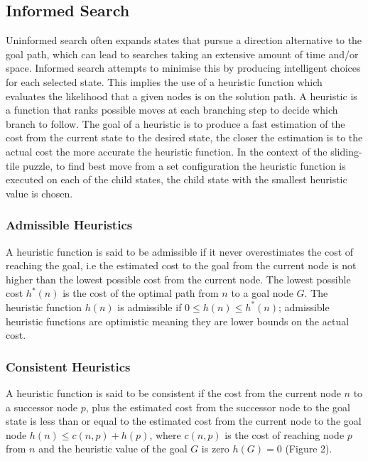 \documentclass[final]{cmpreport}
\begin{document}
\subsection{Informed Search}
Uninformed search often expands states that pursue a direction alternative to the goal path, which can lead to searches taking an extensive amount of time and/or space. Informed search attempts to minimise this by producing intelligent choices for each selected state. This implies the use of a heuristic function which evaluates the likelihood that a given nodes is on the solution path. A heuristic is a function that ranks possible moves at each branching step to decide which branch to follow. The goal of a heuristic is to produce a fast estimation of the cost from the current state to the desired state, the closer the estimation is to the actual cost the more accurate the heuristic function. In the context of the sliding-tile puzzle, to find best move from a set configuration the heuristic function is executed on each of the child states, the child state with the smallest heuristic value is chosen.
 


\subsubsection{Admissible Heuristics}
A heuristic function is said to be admissible if it never overestimates the cost of reaching the goal, i.e the estimated cost to the goal from the current node is not higher than the lowest possible cost from the current node. The lowest possible cost $h^*(n)$ is the cost of the optimal path from $n$ to a goal node $G$. The heuristic function $h(n)$ is admissible if $0 \leq h(n) \leq h^*(n)$; admissible heuristic functions are optimistic meaning they are lower bounds on the actual cost.

\subsubsection{Consistent Heuristics}
 A heuristic function is said to be consistent if the cost from the current node $n$ to a successor node $p$, plus the estimated cost from the successor node to the goal state is less than or equal to the estimated cost from the current node to the goal node $h(n)\leq c(n,p) + h(p)$, where $c(n,p)$ is the cost of reaching node $p$ from $n$ and the heuristic value of the goal $G$ is zero $h(G)=0$ (Figure 2). 
\end{document}
